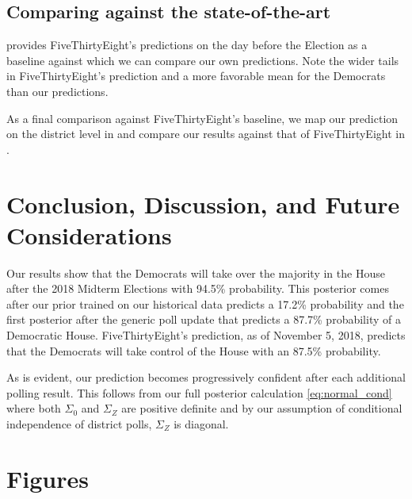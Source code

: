 \documentclass[12pt, letterpaper]{article}
\begin{document}
\subsection{Comparing against the state-of-the-art}

 provides FiveThirtyEight's predictions on the day before the Election as a baseline against which we can compare our own predictions. Note the wider tails in FiveThirtyEight's prediction and a more favorable mean for the Democrats than our predictions.

As a final comparison against FiveThirtyEight's baseline, we map our prediction on the district level in  and compare our results against that of FiveThirtyEight in .

\section{Conclusion, Discussion, and Future Considerations}
\label{sec:conc} 

Our results show that the Democrats will take over the majority in the House after the 2018 Midterm Elections with 94.5\% probability. This posterior comes after our prior trained on our historical data predicts a 17.2\% probability and the first posterior after the generic poll update that predicts a 87.7\% probability of a Democratic House. FiveThirtyEight's prediction, as of November 5, 2018, predicts that the Democrats will take control of the House with an 87.5\% probability.

As is evident, our prediction becomes progressively confident after each additional polling result. This follows from our full posterior calculation \eqref{eq:normal_cond} where both $\Sigma_0$  and $\Sigma_Z$ are positive definite and by our assumption of conditional independence of district polls, $\Sigma_Z$ is diagonal.





\appendix
\section{Figures}
\label{sec:figures}
\end{document}
